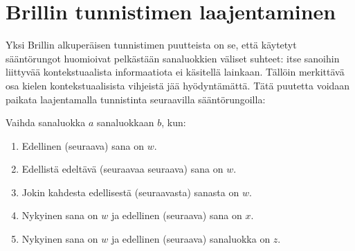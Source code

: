 \documentclass[utf8,bachelor,manualbib]{gradu3}
\begin{document}
\begin{comment}
\begin{table}[H]
\centering
\caption{10 ensimmäistä transformaatiosääntöä Penn Treebank-aineistolla harjoittaessa. Lähde: \citet{brill1995}}
\begin{tabular}{|c|c|c|c|}
\hline
\# & Mistä & Mihin & Ehto \\ \hline
1 & NN & VB & Edellinen sanaluokka on $TO$ \\
2 & VBP & VB & Jokin kolmesta edellisestä sanaluokasta on $MD$ \\
3 & NN & VB & Jokin kahdesta edellisestä sanaluokasta on $MD$ \\
4 & VB & NN & Jokin kahdesta edellisestä sanaluokasta on $DT$ \\
5 & VBD & VBN & Jokin kolmesta edellisestä sanaluokasta on $VBZ$ \\
6 & VBN & VBD & Edellinen sanaluokka on $PRP$ \\
7 & VBN & VBD & Edellinen sanaluokka on $NNP$ \\
8 & VBD & VBN & Edellinen sanaluokka on $VBD$ \\
9 & VBP & VB & Edellinen sanaluokka on $TO$ \\
10 & POS & VBZ & Edellinen sanaluokka on $PRP$ \\ \hline
\end{tabular}
\end{table}
\end{comment}

\section{Brillin tunnistimen laajentaminen}

Yksi Brillin alkuperäisen tunnistimen puutteista on se, että käytetyt sääntörungot huomioivat pelkästään sanaluokkien väliset suhteet: itse sanoihin liittyvää kontekstuaalista informaatiota ei käsitellä lainkaan. Tällöin merkittävä osa kielen kontekstuaalisista vihjeistä jää hyödyntämättä. Tätä puutetta voidaan paikata laajentamalla tunnistinta seuraavilla sääntörungoilla:

Vaihda sanaluokka $a$ sanaluokkaan $b$, kun:
\begin{enumerate}
\item Edellinen (seuraava) sana on $w$.
\item Edellistä edeltävä (seuraavaa seuraava) sana on $w$. 
\item Jokin kahdesta edellisestä (seuraavasta) sanasta on $w$.
\item Nykyinen sana on $w$ ja edellinen (seuraava) sana on $x$.
\item Nykyinen sana on $w$ ja edellinen (seuraava) sanaluokka on $z$.
\end{enumerate}
\end{document}
